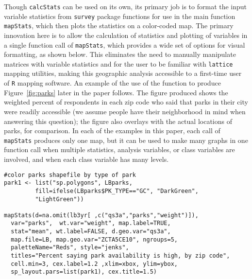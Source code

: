 Though \texttt{calcStats} can be used on its own, its primary job is to format the input variable statistics from \texttt{survey} package functions for use in the main function \texttt{mapStats}, which then plots the statistics on a color-coded map.  The primary innovation here is to allow the calculation of statistics and plotting of variables in a single function call of \texttt{mapStats}, which provides a wide set of options for visual formatting, as shown below.  This eliminates the need to manually manipulate matrices with variable statistics and for the user to be familiar with \texttt{lattice} mapping utilities, making this geographic analysis accessible to a first-time user of \texttt{R} mapping software.  An example of the use of the function to produce Figure~\ref{fig:parks} later in the paper follows.  The figure produced shows the weighted percent of respondents in each zip code who said that parks in their city were readily accessible (we assume people have their neighborhood in mind when answering this question); the figure also overlays with the actual locations of parks, for comparison.  In each of the examples in this paper, each call of \texttt{mapStats} produces only one map, but it can be used to make many graphs in one function call when multiple statistics, analysis variables, or class variables are involved, and when each class variable has many levels. 

\begin{verbatim}
#color parks shapefile by type of park 
park1 <- list("sp.polygons", LBparks, 
         fill=ifelse(LBparks$PK_TYPE=="GC", "DarkGreen", 
         "LightGreen"))

mapStats(d=na.omit(lb3yr[ ,c("qs3a","parks","weight")]), 
  var="parks",  wt.var="weight", map.label=TRUE,
  stat="mean", wt.label=FALSE, d.geo.var="qs3a", 
  map.file=LB, map.geo.var="ZCTA5CE10", ngroups=5,
  paletteName="Reds", style="jenks", 
  titles="Percent saying park availability is high, by zip code", 
  cell.min=3, cex.label=1.2 ,xlim=xbox, ylim=ybox, 
  sp_layout.pars=list(park1), cex.title=1.5)
\end{verbatim}

